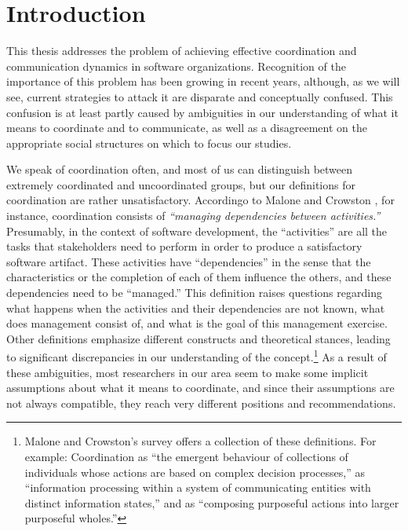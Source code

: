 \chapter{Introduction}

This thesis addresses the problem of achieving effective coordination and communication dynamics in software organizations. Recognition of the importance of this problem has been growing in recent years, although, as we will see, current strategies to attack it are disparate and conceptually confused. This confusion is at least partly caused by ambiguities in our understanding of what it means to coordinate and to communicate, as well as a disagreement on the appropriate social structures on which to focus our studies.

We speak of coordination often, and most of us can distinguish between extremely coordinated and uncoordinated groups, but our definitions for coordination are rather unsatisfactory. Accordingo to Malone and Crowston , for instance, coordination consists of \emph{``managing dependencies between activities.''} Presumably, in the context of software development, the ``activities'' are all the tasks that stakeholders need to perform in order to produce a satisfactory software artifact. These activities have ``dependencies'' in the sense that the characteristics or the completion of each of them influence the others, and these dependencies need to be ``managed.'' This definition raises questions regarding what happens when the activities and their dependencies are not known, what does management consist of, and what is the goal of this management exercise. Other definitions emphasize different constructs and theoretical stances, leading to significant discrepancies in our understanding of the concept.\footnote{Malone and Crowston's survey offers a collection of these definitions. For example: Coordination as ``the emergent behaviour of collections of individuals whose actions are based on complex decision processes,'' as ``information processing within a system of communicating entities with distinct information states,'' and as ``composing purposeful actions into larger purposeful wholes.''} As a result of these ambiguities, most researchers in our area seem to make some implicit assumptions about what it means to coordinate, and since their assumptions are not always compatible, they reach very different positions and recommendations.

